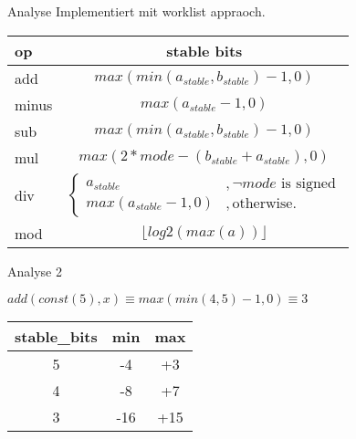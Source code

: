 
\begin{frame}{Analyse}
Implementiert mit worklist appraoch.
\begin{center}
	\begin{tabular}{ l | c }
		op & stable bits \\
		\hline
		add & $max(min(a_{stable}, b_{stable}) - 1, 0)$ \\
		minus &  $max(a_{stable} - 1, 0) $ \\
		sub &  $max(min(a_{stable}, b_{stable}) - 1, 0) $ \\
		mul &  $max(2*mode - ( b_{stable} + a_{stable} ), 0)  $ \\
		div &  
		$ 
		\left\{
		\begin{array}{l}
		a_{stable}\\ 
		max(a_{stable} - 1, 0)
		\end{array}
		\begin{array}{l}
		, \neg mode\text{ is signed} \\ 
		, \text{otherwise}.
		\end{array}
		\right.$\\
		mod & 
		$
		\lfloor log2(max(a))\rfloor
		$
		\\
	\end{tabular}
\end{center}
\end{frame}

\begin{frame}{Analyse 2}
\begin{center}
	$add(const(5), x) \equiv max(min(4, 5) - 1, 0) \equiv 3$
\newline
\newline
\newline
\begin{tabular}{ c | c c }
	stable\_bits & min & max \\
	\hline
	\hline
	5 & -4 & +3 \\
	4 & -8 & +7\\
	3 & -16 & +15 \\
\end{tabular}
\end{center}
\end{frame}

